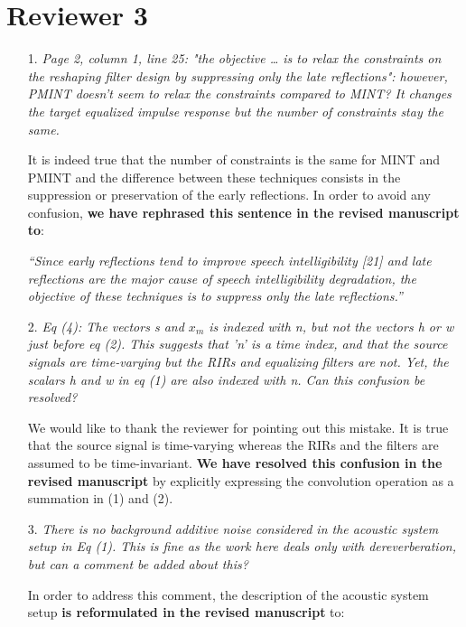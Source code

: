 \documentclass[10pt, a4paper]{article}
\begin{document}
\section{Reviewer 3}

\begin{itemize}

\item[1.] {\textit{Page 2, column 1, line 25: "the objective … is to relax the constraints on the reshaping filter design by suppressing only the late reflections": however, PMINT doesn't seem to relax the constraints compared to MINT? It changes the target equalized impulse response but the number of constraints stay the same.}}

It is indeed true that the number of constraints is the same for MINT and PMINT and the difference between these techniques consists in the suppression or preservation of the early reflections.
In order to avoid any confusion, {\textbf{we have rephrased this sentence in the revised manuscript to}}:

{\emph{``Since early reflections tend to improve speech intelligibility [21] and late reflections are the major cause of speech intelligibility degradation, the objective of these techniques is to suppress only the late reflections.''}}

\item[2.] {\textit{Eq (4): The vectors s and $x_m$ is indexed with n, but not the vectors h or w just before eq (2). This suggests that 'n' is a time index, and that the source signals are time-varying but the RIRs and equalizing filters are not. Yet, the scalars h and w in eq (1) are also indexed with n. Can this confusion be resolved?}}

We would like to thank the reviewer for pointing out this mistake. 
It is true that the source signal is time-varying whereas the RIRs and the filters are assumed to be time-invariant. 
{\textbf{We have resolved this confusion in the revised manuscript}} by explicitly expressing the convolution operation as a summation in (1) and (2).

\item[3.] {\textit{There is no background additive noise considered in the acoustic system setup in Eq (1). This is fine as the work here deals only with dereverberation, but can a comment be added about this?}}

In order to address this comment, the description of the acoustic system setup {\textbf{is reformulated in the revised manuscript}} to:


\end{itemize}
\end{document}

